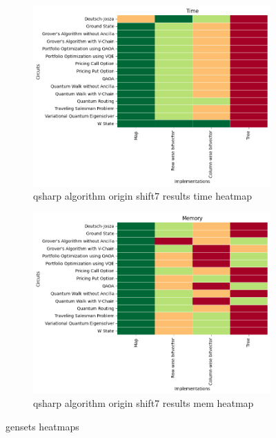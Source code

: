
    \begin{figure}
    \centering
    \begin{subfigure}{.5\textwidth}
      \centering
      \includegraphics[width=1\linewidth]{benchmarks/./qsharp/gensets/algorithm/qsharp_algorithm_origin_shift7_results_time_heatmap.png}
      \caption{qsharp algorithm origin shift7 results time heatmap}
      \label{fig:gensets_qsharp_algorithm_origin_shift7_results_time_heatmap}
    \end{subfigure}
    \begin{subfigure}{.5\textwidth}
      \centering
      \includegraphics[width=1\linewidth]{benchmarks/./qsharp/gensets/algorithm/qsharp_algorithm_origin_shift7_results_mem_heatmap.png}
      \caption{qsharp algorithm origin shift7 results mem heatmap}
      \label{fig:gensets_qsharp_algorithm_origin_shift7_results_mem_heatmap}
    \end{subfigure}
    \caption{gensets heatmaps}
    \label{fig:gensets_qsharp_algorithm_origin_shift7_results_heatmaps}
    \end{figure}
    